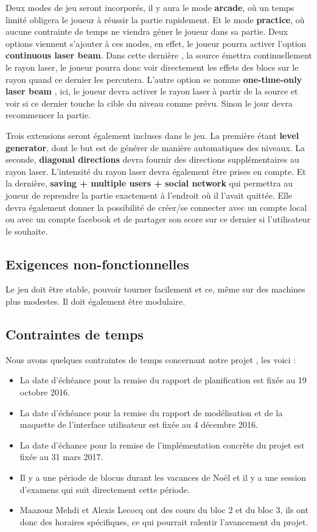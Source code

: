 \documentclass[]{article}
\begin{document}
Deux modes de jeu seront incorporés, il y aura le mode \textbf{arcade}, où un temps limité obligera le joueur à réussir la partie rapidement.
Et le mode \textbf{practice}, où aucune contrainte de temps ne viendra géner le joueur dans sa partie. Deux options viennent s'ajouter à ces modes, en
effet, le joueur pourra activer l'option \textbf{continuous laser beam}. Dans cette dernière , la source émettra continuellement le rayon laser,
le joueur pourra donc voir directement les effets des blocs sur le rayon quand ce dernier les percutera. L'autre option se nomme \textbf{one-time-only laser beam}
, ici, le joueur devra activer le rayon laser à partir de la source et voir si ce dernier touche la cible du niveau comme prévu. Sinon le jour devra
recommencer la partie.

Trois extensions seront également incluses dans le jeu. La première étant \textbf{level generator}, dont le but est de générer de manière
automatiques des niveaux. La seconde, \textbf{diagonal directions} devra fournir des directions supplémentaires au rayon laser. L'intensité du rayon
laser devra également être prises en compte. Et la dernière, \textbf{saving + multiple users + social network} qui permettra au joueur 
de reprendre la partie exactement à l'endroit où il l'avait quittée. Elle devra également donner la possibilité de créer/se connecter avec un compte
local ou avec un compte facebook et de partager son score sur ce dernier si l'utilisateur le souhaite.

\subsection{Exigences non-fonctionnelles}

Le jeu doit être stable, pouvoir tourner facilement et ce, même sur des machines plus modestes. Il doit également être modulaire.

\subsection{Contraintes de temps}

Nous avons quelques contraintes de temps concernant notre projet , les voici :
\\
\begin{itemize}
	\item La date d'échéance pour la remise du rapport de planification est fixée au 19 octobre 2016.
	\item La date d'échéance pour la remise du rapport de modélisation et de la maquette de l'interface utilisateur est fixée au 4 décembre 2016.
	\item La date d'échance pour la remise de l'implémentation concrète du projet est fixée au 31 mars 2017.
	\item Il y a une période de blocus durant les vacances de Noël et il y a une session d'examens qui suit directement cette période.
	\item Maazouz Mehdi et Alexis Lecocq ont des cours du bloc 2 et du bloc 3, ils ont donc des horaires spécifiques, ce qui pourrait ralentir l'avancement du projet.
\end{itemize}
\end{document}
